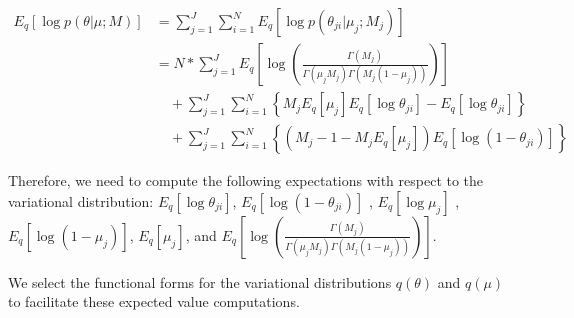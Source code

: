 \documentclass[11pt,reqno]{amsart}
\begin{document}
\begin{equation}
\begin{split}
\label{theta}
E_q \left[ \log p\left(\theta | \mu; M \right)\right] &= \sum_{j=1}^{J} \sum_{i=1}^{N} E_q \left[ \log p\left(\theta_{ji} | \mu_j; M_j \right)\right] \\
&= N* \sum_{j=1}^{J} E_q  \left[ \log \left( \frac{ \Gamma(M_j) } { \Gamma(\mu_j M_j) \Gamma(M_j (1-\mu_j)) }\right) \right] \\
&\quad + \sum_{j=1}^{J} \sum_{i=1}^{N} \left\lbrace M_j E_q \left[ \mu_j \right] E_q \left[ \log \theta_{ji} \right] - E_q  \left[ \log \theta_{ji} \right] \right\rbrace\\
&\quad + \sum_{j=1}^{J} \sum_{i=1}^{N} \left\lbrace \left( M_j - 1 - M_j E_q\left[ \mu_j \right]  \right) E_q\left[ \log \left( 1 - \theta_{ji}\right) \right] \right\rbrace
\end{split}
\end{equation}

Therefore, we need to compute the following expectations with respect to the variational distribution:
%
$ E_q \left[ \log \theta_{ji} \right] $, $ E_q\left[ \log \left( 1 - \theta_{ji}\right) \right] $ , $ E_q  \left[ \log \mu_j \right] $ , $ E_q  \left[ \log (1 - \mu_j)\right] $, $ E_q \left[ \mu_j \right] $, and $ E_q\left[ \log \left( \frac{ \Gamma(M_j) } { \Gamma(\mu_j M_j) \Gamma(M_j (1-\mu_j)) }\right)\right] $.

We select the functional forms for the variational distributions $q(\theta)$ and $q(\mu)$ to facilitate these expected value computations.
\end{document}
